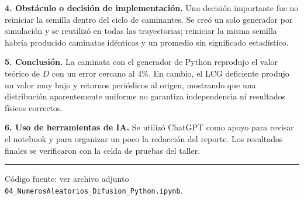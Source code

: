 \documentclass[11pt]{article}
\begin{document}
\textbf{4. Obstáculo o decisión de implementación.}
Una decisión importante fue no reiniciar la semilla dentro del ciclo de caminantes. Se creó un solo generador por simulación y se reutilizó en todas las trayectorias; reiniciar la misma semilla habría producido caminatas idénticas y un promedio sin significado estadístico.

\textbf{5. Conclusión.}
La caminata con el generador de Python reprodujo el valor teórico de $D$ con un error cercano al 4\%. En cambio, el LCG deficiente produjo un valor muy bajo y retornos periódicos al origen, mostrando que una distribución aparentemente uniforme no garantiza independencia ni resultados físicos correctos.

\textbf{6. Uso de herramientas de IA.}
Se utilizó ChatGPT como apoyo para revisar el notebook y para organizar un poco la redacción del reporte. Los resultados finales se verificaron con la celda de pruebas del taller.

\vspace{4pt}
\hrule
\vspace{4pt}
{\small Código fuente: ver archivo adjunto \texttt{04\_NumerosAleatorios\_Difusion\_Python.ipynb}.}
\end{document}
